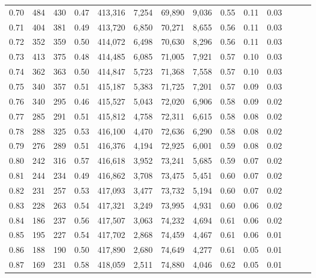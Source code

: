 \begin{tabular}{rrrrrrrrrrrrrr}
0.70 &     484 &    430 &  0.47 &  413,316 &    7,254 &  69,890 &   9,036 &  0.55 &  0.11 &      0.03 \\
0.71 &     404 &    381 &  0.49 &  413,720 &    6,850 &  70,271 &   8,655 &  0.56 &  0.11 &      0.03 \\
0.72 &     352 &    359 &  0.50 &  414,072 &    6,498 &  70,630 &   8,296 &  0.56 &  0.11 &      0.03 \\
0.73 &     413 &    375 &  0.48 &  414,485 &    6,085 &  71,005 &   7,921 &  0.57 &  0.10 &      0.03 \\
0.74 &     362 &    363 &  0.50 &  414,847 &    5,723 &  71,368 &   7,558 &  0.57 &  0.10 &      0.03 \\
0.75 &     340 &    357 &  0.51 &  415,187 &    5,383 &  71,725 &   7,201 &  0.57 &  0.09 &      0.03 \\
0.76 &     340 &    295 &  0.46 &  415,527 &    5,043 &  72,020 &   6,906 &  0.58 &  0.09 &      0.02 \\
0.77 &     285 &    291 &  0.51 &  415,812 &    4,758 &  72,311 &   6,615 &  0.58 &  0.08 &      0.02 \\
0.78 &     288 &    325 &  0.53 &  416,100 &    4,470 &  72,636 &   6,290 &  0.58 &  0.08 &      0.02 \\
0.79 &     276 &    289 &  0.51 &  416,376 &    4,194 &  72,925 &   6,001 &  0.59 &  0.08 &      0.02 \\
0.80 &     242 &    316 &  0.57 &  416,618 &    3,952 &  73,241 &   5,685 &  0.59 &  0.07 &      0.02 \\
0.81 &     244 &    234 &  0.49 &  416,862 &    3,708 &  73,475 &   5,451 &  0.60 &  0.07 &      0.02 \\
0.82 &     231 &    257 &  0.53 &  417,093 &    3,477 &  73,732 &   5,194 &  0.60 &  0.07 &      0.02 \\
0.83 &     228 &    263 &  0.54 &  417,321 &    3,249 &  73,995 &   4,931 &  0.60 &  0.06 &      0.02 \\
0.84 &     186 &    237 &  0.56 &  417,507 &    3,063 &  74,232 &   4,694 &  0.61 &  0.06 &      0.02 \\
0.85 &     195 &    227 &  0.54 &  417,702 &    2,868 &  74,459 &   4,467 &  0.61 &  0.06 &      0.01 \\
0.86 &     188 &    190 &  0.50 &  417,890 &    2,680 &  74,649 &   4,277 &  0.61 &  0.05 &      0.01 \\
0.87 &     169 &    231 &  0.58 &  418,059 &    2,511 &  74,880 &   4,046 &  0.62 &  0.05 &      0.01 \\

\end{tabular}
